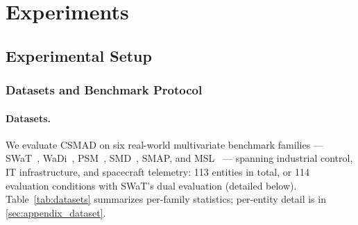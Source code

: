 
\section{Experiments}
\label{sec:experiments}

\subsection{Experimental Setup}
\label{sec:setup}

\subsubsection{Datasets and Benchmark Protocol}
\label{sec:datasets}

\paragraph{Datasets.}
We evaluate CSMAD on six real-world multivariate benchmark families --- SWaT~\cite{goh2016swat},
WaDi~\cite{ahmed2017wadi}, PSM~\cite{abdulaal2021psm}, SMD~\cite{su2019omnianomaly}, SMAP, and
MSL~\cite{hundman2018telemanom} --- spanning industrial control, IT infrastructure, and spacecraft
telemetry: 113 entities in total, or 114 evaluation conditions with SWaT's dual evaluation
(detailed below).
Table~\ref{tab:datasets} summarizes per-family statistics; per-entity detail is in
\ref{sec:appendix_dataset}.


